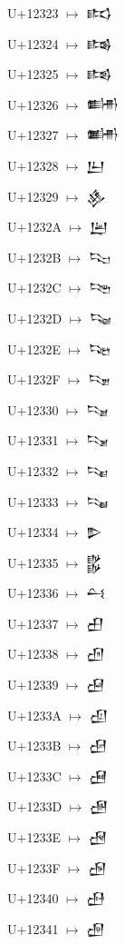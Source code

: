 {\noindent U+12323  $\mapsto$ {\cufont 𒌣}\par
\noindent U+12324  $\mapsto$ {\cufont 𒌤}\par
\noindent U+12325  $\mapsto$ {\cufont 𒌥}\par
\noindent U+12326  $\mapsto$ {\cufont 𒌦}\par
\noindent U+12327  $\mapsto$ {\cufont 𒌧}\par
\noindent U+12328  $\mapsto$ {\cufont 𒌨}\par
\noindent U+12329  $\mapsto$ {\cufont 𒌩}\par
\noindent U+1232A  $\mapsto$ {\cufont 𒌪}\par
\noindent U+1232B  $\mapsto$ {\cufont 𒌫}\par
\noindent U+1232C  $\mapsto$ {\cufont 𒌬}\par
\noindent U+1232D  $\mapsto$ {\cufont 𒌭}\par
\noindent U+1232E  $\mapsto$ {\cufont 𒌮}\par
\noindent U+1232F  $\mapsto$ {\cufont 𒌯}\par
\noindent U+12330  $\mapsto$ {\cufont 𒌰}\par
\noindent U+12331  $\mapsto$ {\cufont 𒌱}\par
\noindent U+12332  $\mapsto$ {\cufont 𒌲}\par
\noindent U+12333  $\mapsto$ {\cufont 𒌳}\par
\noindent U+12334  $\mapsto$ {\cufont 𒌴}\par
\noindent U+12335  $\mapsto$ {\cufont 𒌵}\par
\noindent U+12336  $\mapsto$ {\cufont 𒌶}\par
\noindent U+12337  $\mapsto$ {\cufont 𒌷}\par
\noindent U+12338  $\mapsto$ {\cufont 𒌸}\par
\noindent U+12339  $\mapsto$ {\cufont 𒌹}\par
\noindent U+1233A  $\mapsto$ {\cufont 𒌺}\par
\noindent U+1233B  $\mapsto$ {\cufont 𒌻}\par
\noindent U+1233C  $\mapsto$ {\cufont 𒌼}\par
\noindent U+1233D  $\mapsto$ {\cufont 𒌽}\par
\noindent U+1233E  $\mapsto$ {\cufont 𒌾}\par
\noindent U+1233F  $\mapsto$ {\cufont 𒌿}\par
\noindent U+12340  $\mapsto$ {\cufont 𒍀}\par
\noindent U+12341  $\mapsto$ {\cufont 𒍁}\par
}
